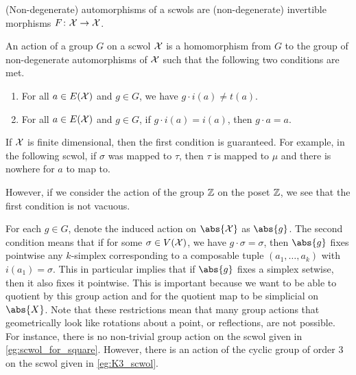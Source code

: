 (Non-degenerate) automorphisms of a scwols are (non-degenerate) invertible morphisms $F \colon \mathcal{X} \to \mathcal{X}$.

\begin{definition}
	An action of a group $G$ on a scwol $\mathcal{X}$ is a homomorphism from $G$ to the group of non-degenerate automorphisms of $\mathcal{X}$ such that the following two conditions are met.
	\begin{enumerate}
		\item For all $a \in E(\mathcal{X})$ and $g \in G$, we have  $g \cdot i(a) \neq t(a)$.
		\item For all $a \in E(\mathcal{X})$ and $g \in G$, if  $g\cdot i(a)=i(a)$, then  $g\cdot a = a$.
	\end{enumerate}
	\label{def:action_of_groups_on_scwols}
\end{definition}

If $\mathcal{X}$ is finite dimensional, then the first condition is guaranteed.
For example, in the following scwol, if $\sigma$ was mapped to  $\tau$, then $\tau$ is mapped to $\mu$ and there is nowhere for $a$ to map to.

\begin{center}
\end{center}

However, if we consider the action of the group $\mathbb{Z}$ on the poset $\mathbb{Z}$, we see that  the first condition is not vacuous.

For each $g \in G$, denote the induced action on  $\abs{\calx}$ as $\abs{g}$.
The second condition means that if for some $\sigma \in V(\mathcal{X})$, we have $g \cdot \sigma = \sigma$, then $\abs{g}$ fixes pointwise any $k$-simplex corresponding to a composable tuple $(a_1,  \ldots, a_k)$ with $i(a_1)=\sigma$.
This in particular implies that if $\abs{g}$ fixes a simplex setwise, then it also fixes it pointwise.
This is important because we want to be able to quotient by this group action and for the quotient map  to be simplicial on $\abs{X}$.
Note that these restrictions mean that many group actions that geometrically look like rotations about a point, or reflections, are not possible.
For instance, there is no non-trivial group action on the scwol given in \cref{eg:scwol_for_square}.
However, there is an action of the cyclic group of order 3 on the scwol given in \cref{eg:K3_scwol}.

